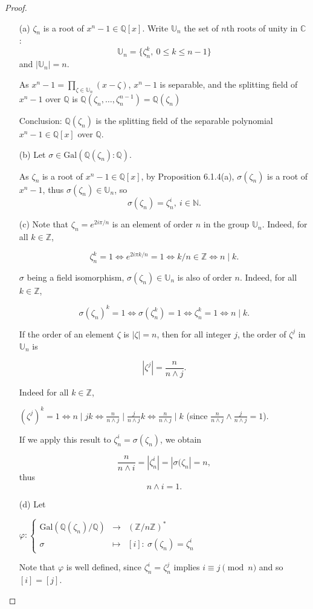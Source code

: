 \documentclass[11pt,a4paper]{article}
\newcommand{\Q}{\mathbb{Q}}
\newcommand{\Z}{\mathbb{Z}}
\newcommand{\N}{\mathbb{N}}
\newcommand{\C}{\mathbb{C}}
\newcommand{\U}{\mathbb{U}}
\newcommand{\Gal}{\mathrm{Gal}}
\begin{document}
\begin{proof}
\begin{enumerate}
\item[(a)]
 $\zeta_n$ is a root of $x^n-1\in \Q[x]$. Write $\U_n$ the set of $n$th  roots of unity in $\C$ : $$\U_n = \{\zeta_n^k,\  0\leq k \leq n-1\}$$ and $|\U_n| = n$.

As $x^n-1 = \prod\limits_{\zeta \in \U_n}(x-\zeta)$, $x^n-1$ is separable, and the splitting field of $x^n-1$ over $\Q$ is 
$\Q(\zeta_n,\ldots, \zeta_n^{n-1}) = \Q(\zeta_n)$

Conclusion: $\Q(\zeta_n)$ is the splitting field of the separable polynomial $x^n-1\in \Q[x]$ over $\Q$.

\item[(b)]
Let $\sigma \in \Gal(\Q(\zeta_n):\Q)$.

As $\zeta_n$ is a root of $x^n - 1 \in \Q[x]$, by Proposition 6.1.4(a), $\sigma(\zeta_n) $ is a root of $x^n-1$, thus  $\sigma(\zeta_n)  \in \U_n$, so
$$\sigma(\zeta_n) = \zeta_n^i,\  i \in \N.$$

\item[(c)] Note that $\zeta_n = e^{2i\pi/n}$ is an element of order $n$ in the group $\U_n$. Indeed, for all $k\in \Z$,

$$\zeta_n^k = 1     \iff e^{2i\pi k /n} = 1 \iff k/n \in \Z \iff n\mid k.$$   

$\sigma$ being a field isomorphism, $\sigma(\zeta_n) \in \U_n$ is also of order $n$. Indeed, for all $k\in \Z$,

$$\sigma(\zeta_n) ^k=1 \iff \sigma(\zeta_n^k)=1 \iff \zeta_n^k = 1 \iff n \mid k.$$

If the order of an element $\zeta $ is $| \zeta| =n$, then for all integer $j$,  the order of $\zeta^j$ in  $\U_n$ is

$$|\zeta^j |= \frac{n}{n\wedge j}.$$

Indeed for all $k\in \Z$, 

$(\zeta^j)^k = 1 \iff n \mid jk \iff \frac{n}{n\wedge j} \mid \frac{j}{n\wedge j} k \iff \frac{n}{n\wedge j} \mid k$ (since $\frac{n}{n\wedge j} \wedge \frac{j}{n\wedge j}=1$).

If we apply this result to $\zeta_n^i =\sigma(\zeta_n)$, we obtain

  $$\frac{n}{n\wedge i} = | \zeta_n^i |= | \sigma(\zeta_n |= n,$$ thus $$n\wedge i = 1.$$
                                                 
\item[(d)]
Let
\begin{center}
$
\varphi : 
\left\{
\begin{array}{ccc}
 \Gal(\Q(\zeta_n)/\Q) &  \to  & ( \Z/n\Z)^* \\
  \sigma &  \mapsto  &  [i] : \ \sigma(\zeta_n) = \zeta_n^i
\end{array}
\right.
$
\end{center}
Note that $\varphi$ is well defined, since $\zeta_n^i = \zeta_n^j$ implies $i\equiv j \pmod n$ and so $[i] = [j]$.


\end{enumerate}
\end{proof}
\end{document}
